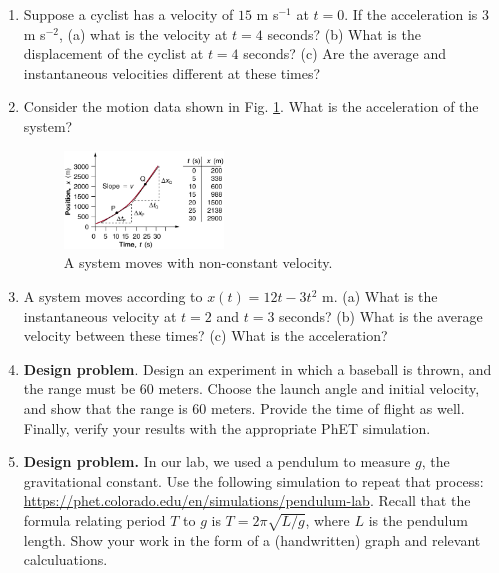 \documentclass[10pt]{article}
\begin{document}
\begin{enumerate}
\item Suppose a cyclist has a velocity of $15$ m s$^{-1}$ at $t=0$.  If the acceleration is 3 m s$^{-2}$, (a) what is the velocity at $t = 4$ seconds? (b) What is the displacement of the cyclist at $t = 4$ seconds? (c) Are the average and instantaneous velocities different at these times?  \\ \vspace{3cm}
\item Consider the motion data shown in Fig. \ref{fig:1}.  What is the acceleration of the system?
\begin{figure}
\centering
\includegraphics[width=0.4\textwidth]{slope2.jpeg}
\caption{\label{fig:1} A system moves with non-constant velocity.}
\end{figure} \vspace{3cm}
\item A system moves according to $x(t) = 12t - 3t^2$ m. (a) What is the instantaneous velocity at $t = 2$ and $t = 3$ seconds? (b) What is the average velocity between these times? (c) What is the acceleration? \\ \vspace{3cm}
\item \textbf{Design problem}.  Design an experiment in which a baseball is thrown, and the range must be 60 meters.  Choose the launch angle and initial velocity, and show that the range is 60 meters.  Provide the time of flight as well.  Finally, verify your results with the appropriate PhET simulation. \\ \vspace{3.5cm}
\item \textbf{Design problem.}  In our lab, we used a pendulum to measure $g$, the gravitational constant.  Use the following simulation to repeat that process: \url{https://phet.colorado.edu/en/simulations/pendulum-lab}. Recall that the formula relating period $T$ to $g$ is $T = 2\pi\sqrt{L/g}$, where $L$ is the pendulum length. Show your work in the form of a (handwritten) graph and relevant calculuations. \\ \vspace{3.5cm}
\end{enumerate}
\end{document}
